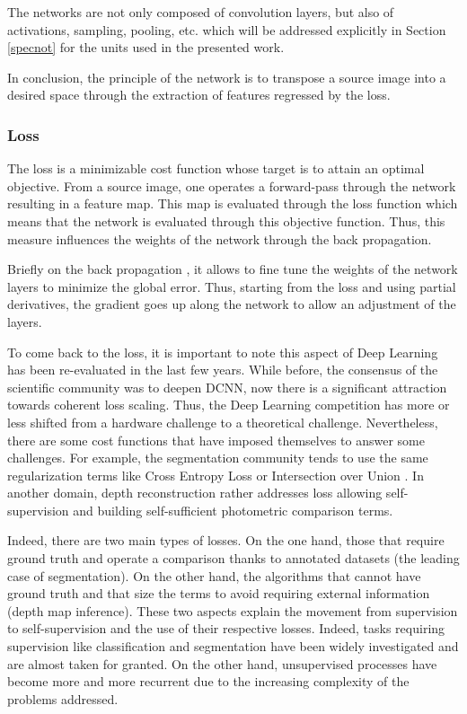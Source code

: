 The networks are not only composed of convolution layers, but also of activations, sampling, pooling, etc. which will be addressed explicitly in Section \ref{specnot} for the units used in the presented work.

In conclusion, the principle of the network is to transpose a source image into a desired space through the extraction of features regressed by the loss.



\subsubsection{Loss}

The loss is a minimizable cost function whose target is to attain an optimal objective. From a source image, one operates a forward-pass through the network resulting in a feature map. This map is evaluated through the loss function which means that the network is evaluated through this objective function. Thus, this measure influences the weights of the network through the back propagation.

Briefly on the back propagation \cite{bryson1961gradient}, it allows to fine tune the weights of the network layers to minimize the global error. Thus, starting from the loss and using partial derivatives, the gradient goes up along the network to allow an adjustment of the layers.

To come back to the loss, it is important to note this aspect of Deep Learning has been re-evaluated in the last few years. While before, the consensus of the scientific community was to deepen DCNN, now there is a significant attraction towards coherent loss scaling. Thus, the Deep Learning competition has more or less shifted from a hardware challenge to a theoretical challenge. Nevertheless, there are some cost functions that have imposed themselves to answer some challenges. For example, the segmentation community tends to use the same regularization terms like Cross Entropy Loss or Intersection over Union \cite{everingham2015pascal}. In another domain, depth reconstruction rather addresses loss allowing self-supervision and building self-sufficient photometric comparison terms\cite{godard2017unsupervised}.

Indeed, there are two main types of losses. On the one hand, those that require ground truth and operate a comparison thanks to annotated datasets (the leading case of segmentation). On the other hand, the algorithms that cannot have ground truth and that size the terms to avoid requiring external information (depth map inference). These two aspects explain the movement from supervision to self-supervision and the use of their respective losses. Indeed, tasks requiring supervision like classification and segmentation have been widely investigated and are almost taken for granted. On the other hand, unsupervised processes have become more and more recurrent due to the increasing complexity of the problems addressed.



